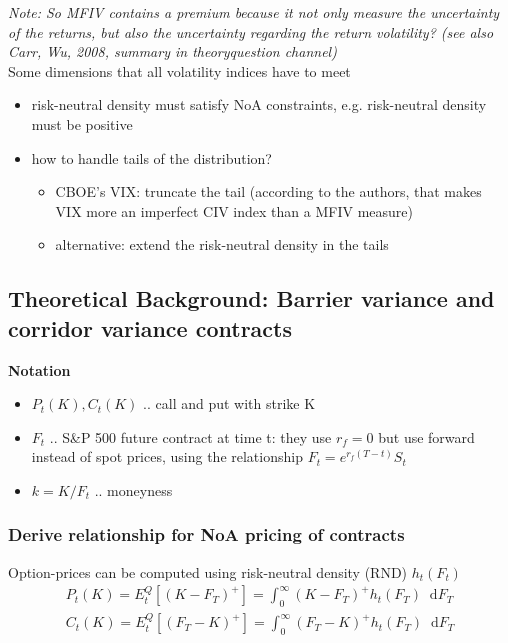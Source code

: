 \documentclass{article}
\newcommand*\diff{\mathop{}\!\mathrm{d}}
\begin{document}
\textit{Note: So MFIV contains a premium because it not only measure the uncertainty of the returns, but also the uncertainty regarding the return volatility? (see also Carr, Wu, 2008, summary in theoryquestion channel)}\\

Some dimensions that all volatility indices have to meet
\begin{itemize}
    \item risk-neutral density must satisfy NoA constraints, e.g. risk-neutral density must be positive
    \item how to handle tails of the distribution?
    \begin{itemize}
        \item CBOE's VIX: truncate the tail (according to the authors, that makes VIX more an imperfect CIV index than a MFIV measure)
        \item alternative: extend the risk-neutral density in the tails
    \end{itemize}
\end{itemize}

\subsection{Theoretical Background: Barrier variance and corridor variance contracts}

\textbf{Notation}

\begin{itemize}
	\item $P_{t}(K), C_{t}(K)$ .. call and put with strike K 
    \item $F_{t}$ .. S\&P 500 future contract at time t: they use $r_{f} = 0$ but use forward instead of spot prices, using the relationship $F_{t} = e^{r_{f}(T-t)} S_{t}$ 
    \item $k = K/F_{t}$ .. moneyness
\end{itemize}

\subsubsection{Derive relationship for NoA pricing of contracts}

Option-prices can be computed using risk-neutral density (RND) $h_{t}(F_{t})$
\begin{align*}
P_{t}(K) = E_{t}^{Q}[(K - F_{T})^{+}] = \int_{0}^{\infty} (K-F_{T})^{+} h_{t}(F_{T}) \diff F_{T} \\
C_{t}(K) = E_{t}^{Q}[(F_{T} - K)^{+}] = \int_{0}^{\infty} (F_{T} - K)^{+} h_{t}(F_{T}) \diff F_{T}
\end{align*}
\end{document}
